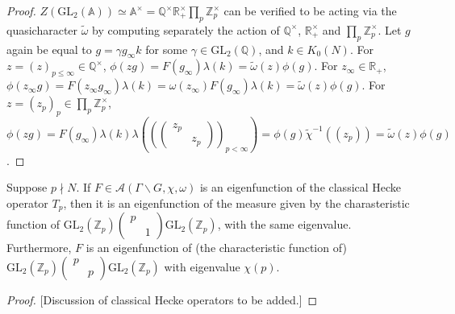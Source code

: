 \begin{proof}
$Z(\text{GL}_2(\mathbb{A})) \simeq \mathbb{A}^{\times} = \mathbb{Q}^{\times}\mathbb{R}_{+}^{\times}\prod_{p}\mathbb{Z}_p^{\times}$ can be verified to be acting via the quasicharacter $\tilde{\omega}$ by computing separately the action of $\mathbb{Q}^{\times}$,  $\mathbb{R}_{+}^{\times}$ and $\prod_{p}\mathbb{Z}_p^{\times}$. Let $g$ again be equal to $g = \gamma g_{\infty} k$ for some $\gamma \in \text{GL}_2(\mathbb{Q})$, and $k \in K_0(N)$. For $z = (z)_{p \leq \infty} \in \mathbb{Q}^{\times}$, $\phi(zg) = F(g_{\infty})\lambda(k) = \tilde{\omega}(z)\phi(g)$. For $z_{\infty} \in \mathbb{R}_{+}$, $\phi(z_{\infty} g) = F(z_{\infty} g_{\infty})\lambda(k) = \omega(z_\infty)F(g_{\infty})\lambda(k) = \tilde{\omega}(z)\phi(g)$. For $z = (z_p)_p \in \prod_{p}\mathbb{Z}_p^{\times}$, $\phi(zg) = F(g_\infty)\lambda(k)\lambda((\begin{pmatrix} z_p &  \\  & z_p \end{pmatrix})_{p < \infty}) = \phi(g)\tilde{\chi}^{-1}((z_p)) =  \tilde{\omega}(z)\phi(g)$.
\end{proof}



\begin{proposition}
\label{proposition-Hecke-operators}
Suppose $p \nmid N$. If $F \in \mathcal{A}(\Gamma \backslash G, \chi, \omega)$ is an eigenfunction of the classical Hecke operator $T_p$, then it is an eigenfunction of the measure given by the charasteristic function of $\text{GL}_2(\mathbb{Z}_p) \begin{pmatrix}  p &  \\ & 1 \end{pmatrix} \text{GL}_2(\mathbb{Z}_p)$, with the same eigenvalue. Furthermore, $F$ is an eigenfunction of (the characteristic function of) $\text{GL}_2(\mathbb{Z}_p) \begin{pmatrix}  p &  \\ & p \end{pmatrix} \text{GL}_2(\mathbb{Z}_p)$ with eigenvalue $\chi(p)$.
\end{proposition}


\begin{proof}
 
 [Discussion of classical Hecke operators to be added.]
\end{proof}









